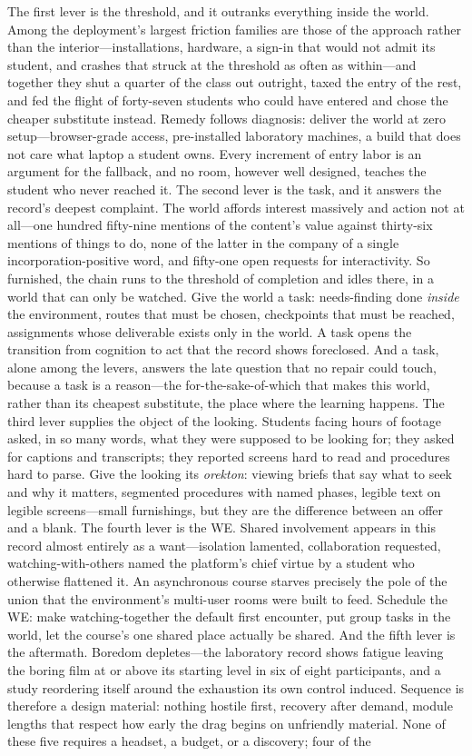 The first lever is the threshold, and it outranks everything inside the world. Among the deployment's largest friction families are those of the approach rather than the interior---installations, hardware, a sign-in that would not admit its student, and crashes that struck at the threshold as often as within---and together they shut a quarter of the class out outright, taxed the entry of the rest, and fed the flight of forty-seven students who could have entered and chose the cheaper substitute instead. Remedy follows diagnosis: deliver the world at zero setup---browser-grade access, pre-installed laboratory machines, a build that does not care what laptop a student owns. Every increment of entry labor is an argument for the fallback, and no room, however well designed, teaches the student who never reached it. The second lever is the task, and it answers the record's deepest complaint. The world affords interest massively and action not at all---one hundred fifty-nine mentions of the content's value against thirty-six mentions of things to do, none of the latter in the company of a single incorporation-positive word, and fifty-one open requests for interactivity. So furnished, the chain runs to the threshold of completion and idles there, in a world that can only be watched. Give the world a task: needs-finding done \textit{inside} the environment, routes that must be chosen, checkpoints that must be reached, assignments whose deliverable exists only in the world. A task opens the transition from cognition to act that the record shows foreclosed. And a task, alone among the levers, answers the late question that no repair could touch, because a task is a reason---the for-the-sake-of-which that makes this world, rather than its cheapest substitute, the place where the learning happens. The third lever supplies the object of the looking. Students facing hours of footage asked, in so many words, what they were supposed to be looking for; they asked for captions and transcripts; they reported screens hard to read and procedures hard to parse. Give the looking its \textit{orekton}: viewing briefs that say what to seek and why it matters, segmented procedures with named phases, legible text on legible screens---small furnishings, but they are the difference between an offer and a blank. The fourth lever is the WE. Shared involvement appears in this record almost entirely as a want---isolation lamented, collaboration requested, watching-with-others named the platform's chief virtue by a student who otherwise flattened it. An asynchronous course starves precisely the pole of the union that the environment's multi-user rooms were built to feed. Schedule the WE: make watching-together the default first encounter, put group tasks in the world, let the course's one shared place actually be shared. And the fifth lever is the aftermath. Boredom depletes---the laboratory record shows fatigue leaving the boring film at or above its starting level in six of eight participants, and a study reordering itself around the exhaustion its own control induced. Sequence is therefore a design material: nothing hostile first, recovery after demand, module lengths that respect how early the drag begins on unfriendly material. None of these five requires a headset, a budget, or a discovery; four of the 